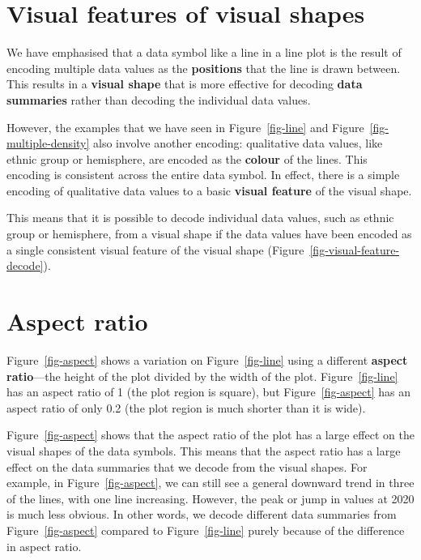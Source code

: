 \documentclass[
  letterpaper,
  DIV=11,
  numbers=noendperiod]{scrreprt}
\begin{document}
\section{Visual features of visual shapes}\label{sec-vis-shape-feature}

We have emphasised that a data symbol like a line in a line plot is the
result of encoding multiple data values as the \textbf{positions} that
the line is drawn between. This results in a \textbf{visual shape} that
is more effective for decoding \textbf{data summaries} rather than
decoding the individual data values.

However, the examples that we have seen in Figure~\ref{fig-line} and
Figure~\ref{fig-multiple-density} also involve another encoding:
qualitative data values, like ethnic group or hemisphere, are encoded as
the \textbf{colour} of the lines. This encoding is consistent across the
entire data symbol. In effect, there is a simple encoding of qualitative
data values to a basic \textbf{visual feature} of the visual shape.

This means that it is possible to decode individual data values, such as
ethnic group or hemisphere, from a visual shape if the data values have
been encoded as a single consistent visual feature of the visual shape
(Figure~\ref{fig-visual-feature-decode}).

\section{Aspect ratio}\label{sec-aspect-ratio}

Figure~\ref{fig-aspect} shows a variation on Figure~\ref{fig-line} using
a different \textbf{aspect ratio}---the height of the plot divided by
the width of the plot. Figure~\ref{fig-line} has an aspect ratio of 1
(the plot region is square), but Figure~\ref{fig-aspect} has an aspect
ratio of only 0.2 (the plot region is much shorter than it is wide).

Figure~\ref{fig-aspect} shows that the aspect ratio of the plot has a
large effect on the visual shapes of the data symbols. This means that
the aspect ratio has a large effect on the data summaries that we decode
from the visual shapes. For example, in Figure~\ref{fig-aspect}, we can
still see a general downward trend in three of the lines, with one line
increasing. However, the peak or jump in values at 2020 is much less
obvious. In other words, we decode different data summaries from
Figure~\ref{fig-aspect} compared to Figure~\ref{fig-line} purely because
of the difference in aspect ratio.
\end{document}
